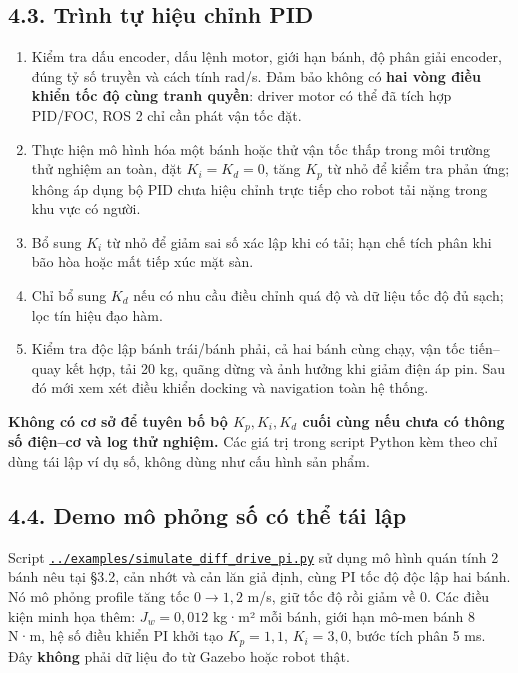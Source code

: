 \documentclass[
  12pt,
  a4paper,
]{article}
\providecommand{\tightlist}{%
  \setlength{\itemsep}{0pt}\setlength{\parskip}{0pt}}
\begin{document}
\subsection{4.3. Trình tự hiệu chỉnh
PID}\label{truxecnh-tux1ef1-hiux1ec7u-chux1ec9nh-pid}

\begin{enumerate}
\def\labelenumi{\arabic{enumi}.}
\tightlist
\item
  Kiểm tra dấu encoder, dấu lệnh motor, giới hạn bánh, độ phân giải
  encoder, đúng tỷ số truyền và cách tính rad/s. Đảm bảo không có
  \textbf{hai vòng điều khiển tốc độ cùng tranh quyền}: driver motor có
  thể đã tích hợp PID/FOC, ROS 2 chỉ cần phát vận tốc đặt.
\item
  Thực hiện mô hình hóa một bánh hoặc thử vận tốc thấp trong môi trường
  thử nghiệm an toàn, đặt \(K_i=K_d=0\), tăng \(K_p\) từ nhỏ để kiểm tra
  phản ứng; không áp dụng bộ PID chưa hiệu chỉnh trực tiếp cho robot tải
  nặng trong khu vực có người.
\item
  Bổ sung \(K_i\) từ nhỏ để giảm sai số xác lập khi có tải; hạn chế tích
  phân khi bão hòa hoặc mất tiếp xúc mặt sàn.
\item
  Chỉ bổ sung \(K_d\) nếu có nhu cầu điều chỉnh quá độ và dữ liệu tốc độ
  đủ sạch; lọc tín hiệu đạo hàm.
\item
  Kiểm tra độc lập bánh trái/bánh phải, cả hai bánh cùng chạy, vận tốc
  tiến--quay kết hợp, tải 20 kg, quãng dừng và ảnh hưởng khi giảm điện
  áp pin. Sau đó mới xem xét điều khiển docking và navigation toàn hệ
  thống.
\end{enumerate}

\textbf{Không có cơ sở để tuyên bố bộ \(K_p,K_i,K_d\) cuối cùng nếu chưa
có thông số điện--cơ và log thử nghiệm.} Các giá trị trong script Python
kèm theo chỉ dùng tái lập ví dụ số, không dùng như cấu hình sản phẩm.

\subsection{4.4. Demo mô phỏng số có thể tái
lập}\label{demo-muxf4-phux1ecfng-sux1ed1-cuxf3-thux1ec3-tuxe1i-lux1eadp}

Script
\href{../examples/simulate_diff_drive_pi.py}{\texttt{../examples/simulate\_diff\_drive\_pi.py}}
sử dụng mô hình quán tính 2 bánh nêu tại §3.2, cản nhớt và cản lăn giả
định, cùng PI tốc độ độc lập hai bánh. Nó mô phỏng profile tăng tốc
\(0\to1,2\) m/s, giữ tốc độ rồi giảm về 0. Các điều kiện minh họa thêm:
\(J_w=0,012\) kg·m² mỗi bánh, giới hạn mô-men bánh \(8\) N·m, hệ số điều
khiển PI khởi tạo \(K_p=1,1\), \(K_i=3,0\), bước tích phân 5 ms. Đây
\textbf{không} phải dữ liệu đo từ Gazebo hoặc robot thật.
\end{document}
